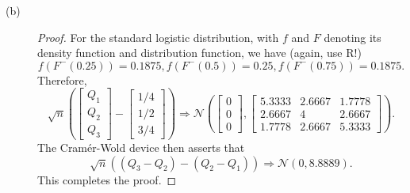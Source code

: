 \documentclass{article}
\newcommand{\gaussian}{\mathcal{N}}
\theoremstyle{definition}
\theoremstyle{plain}
\theoremstyle{remark}
\begin{document}
\begin{description}
\begin{description}
\item[(b)]
\begin{proof}
For the standard logistic distribution, with $f$ and $F$ denoting its
density function and distribution function, we have (again, use R!)
\begin{equation*}
    f(F^{-}(0.25)) = 0.1875,
    f(F^{-}(0.5)) = 0.25,
    f(F^{-}(0.75)) = 0.1875.
\end{equation*}
Therefore,
\begin{equation*}
    \sqrt{n}\left(
    \begin{bmatrix}
    Q_1 \\
    Q_2 \\
    Q_3
    \end{bmatrix} -
    \begin{bmatrix}
    1/4 \\
    1/2 \\
    3/4
    \end{bmatrix}\right) \Rightarrow 
    \gaussian\left(
    \begin{bmatrix}
    0 \\
    0 \\
    0
    \end{bmatrix},
    \begin{bmatrix}
    5.3333 & 2.6667 & 1.7778 \\
    2.6667 & 4 & 2.6667 \\
    1.7778 & 2.6667 & 5.3333
    \end{bmatrix}
    \right).
\end{equation*}
The Cram\'{e}r-Wold device then asserts that
\begin{equation*}
    \sqrt{n}((Q_3 - Q_2) - (Q_2 - Q_1)) \Rightarrow 
    \gaussian(0, 8.8889).
\end{equation*}
This completes the proof.
\end{proof}
\end{description}


\end{description}
\end{document}
